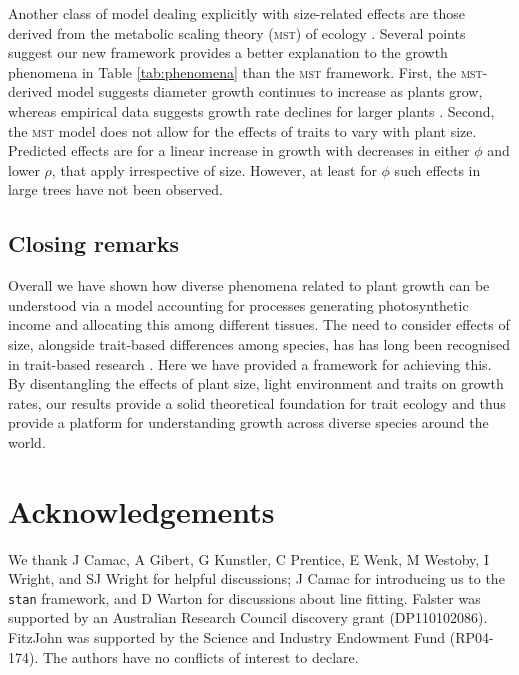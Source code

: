 \documentclass[a4paper,11pt]{article}
\begin{document}
Another class of model dealing explicitly with size-related effects are those derived from the metabolic scaling theory (\textsc{mst}) of ecology \citep{Enquist-1999, Enquist-2007}. Several points suggest our new framework provides a better explanation to the growth phenomena in Table \ref{tab:phenomena} than the \textsc{mst} framework. First, the \textsc{mst}-derived model suggests diameter growth continues to increase as plants grow, whereas empirical data suggests growth rate declines for larger plants \citep{Herault-2011}. Second, the \textsc{mst} model does not allow for the effects of traits to vary with plant size. Predicted effects are for a linear increase in growth with decreases in either $\phi$ and lower $\rho$, that apply irrespective of size. However, at least for $\phi$ such effects in large trees have not been observed.

\subsection{Closing remarks}

Overall we have shown how diverse phenomena related to plant growth can be understood via a model accounting for processes generating photosynthetic income and allocating this among different tissues. The need to consider effects of size, alongside trait-based differences among species, has has long been recognised in trait-based research \cite[e.g.][]{Givnish-1988, Thomas-1999, Moorcroft-2001, Westoby-2002, Enquist-2007}. Here we have provided a framework for achieving this. By disentangling the effects of plant size, light environment and traits on growth rates, our results provide a solid theoretical foundation for trait ecology and thus provide a platform for understanding growth across diverse species around the world.

\section{Acknowledgements}

We thank J Camac, A Gibert, G Kunstler, C Prentice, E Wenk, M Westoby, I Wright, and SJ Wright for helpful discussions; J Camac for introducing us to the \texttt{stan} framework, and D Warton for discussions about {\sma} line fitting. Falster was supported by an Australian Research Council discovery grant (DP110102086). FitzJohn was supported by the Science and Industry Endowment Fund (RP04-174). The authors have no conflicts of interest to declare.
\end{document}
